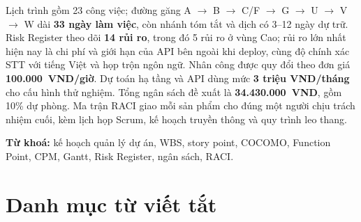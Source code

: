 \documentclass[12pt,a4paper]{report}
\begin{document}
Lịch trình gồm 23 công việc; đường găng A $\rightarrow$ B $\rightarrow$ C/F $\rightarrow$ G $\rightarrow$ U
$\rightarrow$ V $\rightarrow$ W dài \textbf{33 ngày làm việc}, còn nhánh tóm tắt và dịch có 3--12 ngày dự trữ.
Risk Register theo dõi \textbf{14 rủi ro}, trong đó 5 rủi ro ở vùng Cao; rủi ro lớn nhất hiện nay là chi phí và
giới hạn của API bên ngoài khi deploy, cùng độ chính xác STT với tiếng Việt và họp trộn ngôn ngữ. Nhân công được
quy đổi theo đơn giá \textbf{100.000~VND/giờ}. Dự toán hạ tầng và API dùng mức \textbf{3 triệu VND/tháng} cho
cấu hình thử nghiệm. Tổng ngân sách đề xuất là \textbf{34.430.000~VND}, gồm 10\% dự phòng. Ma trận RACI giao
mỗi sản phẩm cho đúng một người chịu trách nhiệm cuối, kèm lịch họp Scrum, kế hoạch truyền thông và quy trình
leo thang.

\textbf{Từ khoá:} kế hoạch quản lý dự án, WBS, story point, COCOMO, Function Point, CPM, Gantt, Risk Register,
ngân sách, RACI.

\chapter*{Danh mục từ viết tắt}
\end{document}

